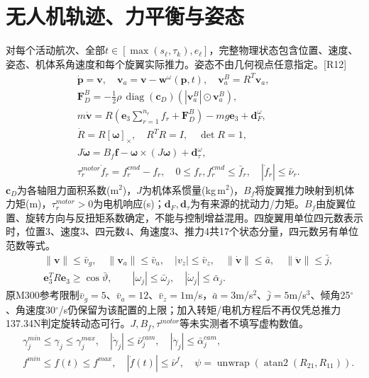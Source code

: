 \section{无人机轨迹、力平衡与姿态}
\noindent 对每个活动航次、全部$t\in[\max(s_\ell,\tau_k),e_\ell]$，完整物理状态包含位置、速度、姿态、机体系角速度和每个旋翼实际推力。姿态不由几何视点任意指定。[R12]
\begin{align}
 &\dot{\mathbf p}=\mathbf v,\quad \mathbf v_a=\mathbf v-\mathbf w^\omega(\mathbf p,t),\quad
 \mathbf v_a^B=R^T\mathbf v_a,\label{eng:eq:kinematic}\\
 &\mathbf F_D^B=-\tfrac12\rho\,\operatorname{diag}(\mathbf c_D)
                         (|\mathbf v_a^B|\odot\mathbf v_a^B),\\
 &m\dot{\mathbf v}=R\left(\mathbf e_3\sum_{r=1}^{n_r} f_r+\mathbf F_D^B\right)
                   -mg\mathbf e_3+\mathbf d_F^\omega,\\
 &\dot R=R[\boldsymbol\omega]_\times,\quad R^TR=I,\quad\det R=1,\\
 &J\dot{\boldsymbol\omega}=B_f\mathbf f-\boldsymbol\omega\times(J\boldsymbol\omega)
                           +\mathbf d_\tau^\omega,\label{eng:eq:rigidbody}\\
 &\tau_r^{motor}\dot f_r=f_r^{cmd}-f_r,\quad
 0\le f_r,f_r^{cmd}\le\bar f_r,\quad |\dot f_r|\le\bar\nu_r.
 \label{eng:eq:actuator}
\end{align}
\noindent $\mathbf c_D$为各轴阻力面积系数(m$^2$)，$J$为机体系惯量(kg\,m$^2$)，$B_f$将旋翼推力映射到机体力矩(m)，$\tau_r^{motor}>0$为电机响应(s)；$\mathbf d_F,\mathbf d_\tau$为有来源的扰动力/力矩。$B_f$由旋翼位置、旋转方向与反扭矩系数确定，不能与控制增益混用。四旋翼用单位四元数表示时，位置3、速度3、四元数4、角速度3、推力4共17个状态分量，四元数另有单位范数等式。
\begin{align}
 &\|\mathbf v\|\le\bar v_g,\quad\|\mathbf v_a\|\le\bar v_a,
 \quad |v_z|\le\bar v_z,\quad\|\dot{\mathbf v}\|\le\bar a,
 \quad\|\ddot{\mathbf v}\|\le\bar j,\\
 &\mathbf e_3^TR\mathbf e_3\ge\cos\bar\vartheta,\qquad
 |\omega_j|\le\bar\omega_j,\quad |\dot\omega_j|\le\bar\alpha_j.
 \label{eng:eq:attitude}
\end{align}
\noindent 原M300参考限制$\bar v_g=5$、$\bar v_a=12$、$\bar v_z=1$m/s，$\bar a=3$m/s$^2$、$\bar j=5$m/s$^3$、倾角25$^\circ$、角速度30$^\circ$/s仍保留为该配置的上限；加入转矩/电机方程后不再仅凭总推力137.34N判定旋转动态可行。$J,B_f,\tau^{motor}$等未实测者不填写虚构数值。
\begin{align}
 &\gamma_j^{min}\le\gamma_j\le\gamma_j^{max},\quad
 |\dot\gamma_j|\le\bar\nu_j^{cam},\quad|\ddot\gamma_j|\le\bar\alpha_j^{cam},\\
 &f^{min}\le f(t)\le f^{max},\quad |\dot f(t)|\le\bar\nu^f,
 \quad\psi=\operatorname{unwrap}(\operatorname{atan2}(R_{21},R_{11})).
 \label{eng:eq:gimbal}
\end{align}
